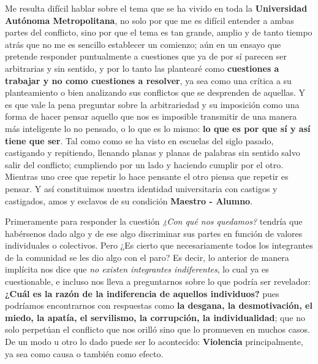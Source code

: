 
Me resulta difícil hablar sobre el tema que se ha vivido en toda la
\textbf{Universidad Autónoma Metropolitana}, no solo por que me es difícil
entender a ambas partes del conflicto, sino por que el tema es tan grande,
amplio y de tanto tiempo atrás que no me es sencillo establecer un comienzo; aún
en un ensayo que pretende responder puntualmente a cuestiones que ya de por sí
parecen ser arbitrarias y sin sentido, y por lo tanto las plantearé como
\textbf{cuestiones a trabajar y no como cuestiones a resolver}, ya sea como una
crítica a su planteamiento o bien analizando sus conflictos que se desprenden de
aquellas. Y es que vale la pena preguntar sobre la arbitrariedad y su imposición
como una forma de hacer pensar aquello que nos es imposible transmitir de una
manera más inteligente lo no pensado, o lo que es lo mismo: \textbf{lo que es
por que sí y así tiene que ser}. Tal como como se ha visto en escuelas del siglo
pasado, castigando y repitiendo, llenando planas y planas de palabras sin
sentido salvo salir del conflicto; cumpliendo por un lado y haciendo cumplir por
el otro. Mientras uno cree que repetir lo hace pensante el otro piensa que
repetir es pensar. Y así constituimos nuestra identidad universitaria con
castigos y castigados, amos y esclavos de su condición \textbf{Maestro - 
Alumno}.

Primeramente para responder la cuestión \emph{¿Con qué nos quedamos?} tendría
que habérsenos dado algo y de ese algo discriminar sus partes en función de
valores individuales o colectivos. Pero ¿Es cierto que necesariamente todos los
integrantes de la comunidad se les dio algo con el paro? Es decir, lo anterior
de manera implícita nos dice que \emph{no existen integrantes indiferentes}, lo
cual ya es cuestionable, e incluso nos lleva a preguntarnos sobre lo que podría
ser revelador: \textbf{¿Cuál es la razón de la indiferencia de aquellos
individuos?} pues podríamos encontrarnos con respuestas como
\textbf{la desgana, la desmotivación, el miedo, la apatía, el servilismo, la
corrupción, la individualidad}; que no solo perpetúan el conflicto que nos
orilló sino que lo promueven en muchos casos. De un modo u otro lo dado puede
ser lo acontecido: \textbf{Violencia} principalmente, ya sea como causa o
también como efecto.

